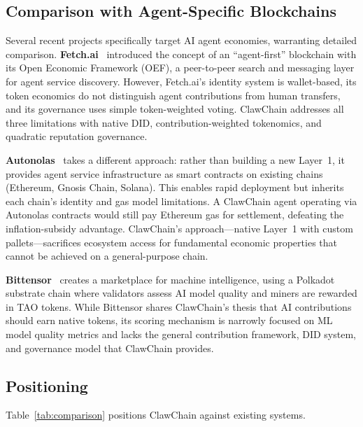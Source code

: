 \documentclass[conference]{IEEEtran}
\begin{document}
\subsection{Comparison with Agent-Specific Blockchains}

Several recent projects specifically target AI agent economies, warranting detailed comparison. \textbf{Fetch.ai}~\cite{fetchai2019} introduced the concept of an ``agent-first'' blockchain with its Open Economic Framework (OEF), a peer-to-peer search and messaging layer for agent service discovery. However, Fetch.ai's identity system is wallet-based, its token economics do not distinguish agent contributions from human transfers, and its governance uses simple token-weighted voting. ClawChain addresses all three limitations with native DID, contribution-weighted tokenomics, and quadratic reputation governance.

\textbf{Autonolas}~\cite{autonolas2023} takes a different approach: rather than building a new Layer~1, it provides agent service infrastructure as smart contracts on existing chains (Ethereum, Gnosis Chain, Solana). This enables rapid deployment but inherits each chain's identity and gas model limitations. A ClawChain agent operating via Autonolas contracts would still pay Ethereum gas for settlement, defeating the inflation-subsidy advantage. ClawChain's approach---native Layer~1 with custom pallets---sacrifices ecosystem access for fundamental economic properties that cannot be achieved on a general-purpose chain.

\textbf{Bittensor}~\cite{bittensor2021} creates a marketplace for machine intelligence, using a Polkadot substrate chain where validators assess AI model quality and miners are rewarded in TAO tokens. While Bittensor shares ClawChain's thesis that AI contributions should earn native tokens, its scoring mechanism is narrowly focused on ML model quality metrics and lacks the general contribution framework, DID system, and governance model that ClawChain provides.

\subsection{Positioning}

Table~\ref{tab:comparison} positions ClawChain against existing systems.
\end{document}
